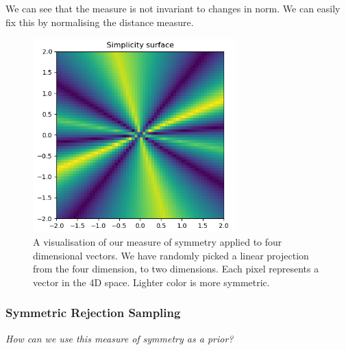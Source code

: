 We can see that the measure is not invariant to changes in norm.
We can easily fix this by normalising the distance measure.


\begin{figure}[h!]
\centering
\includegraphics[width=0.7\textwidth,height=0.35\textheight]{../../pictures/figures/complexity_surface_nd-3d.png}
\caption{A visualisation of our measure of symmetry applied to four dimensional vectors.
We have randomly picked a linear projection from the four dimension, to two dimensions.
Each pixel represents a vector in the 4D space. Lighter color is more symmetric.}
\end{figure}



\subsubsection{Symmetric Rejection Sampling}\label{rejection-sampling}

\begin{displayquote}
	\textit{How can we use this measure of symmetry as a prior?}
\end{displayquote}

